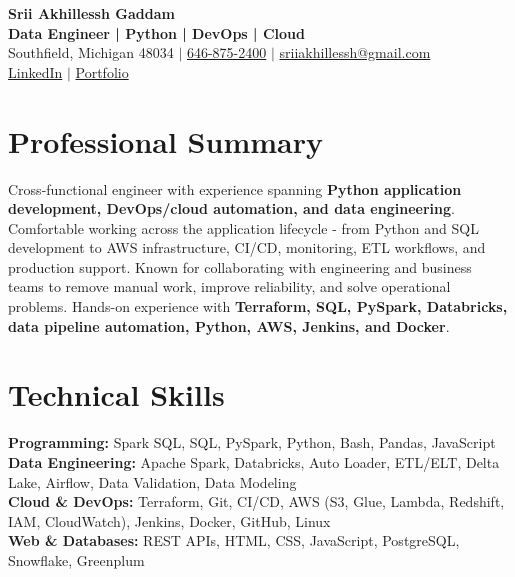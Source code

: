 \documentclass[letterpaper,10pt]{article}
\begin{document}
\fontsize{9.35pt}{10.45pt}\selectfont

\begin{center}
    {\LARGE \textbf{Srii Akhillessh Gaddam}} \\[-1pt]
    \textbf{Data Engineer | Python | DevOps | Cloud} \\[2pt]
    Southfield, Michigan 48034 $|$
    \href{tel:6468752400}{646-875-2400} $|$
    \href{mailto:sriiakhillessh@gmail.com}{sriiakhillessh@gmail.com} \\[1pt]
    \href{https://www.linkedin.com/in/srii-akhiilessh-gaddam-b48668191/}{LinkedIn} $|$
    \href{https://sriiakhillesshg.github.io/portfolio/}{Portfolio}
\end{center}
\vspace{-8pt}

\section{Professional Summary}
\small{Cross-functional engineer with experience spanning \textbf{Python application development, DevOps/cloud automation, and data engineering}. Comfortable working across the application lifecycle - from Python and SQL development to AWS infrastructure, CI/CD, monitoring, ETL workflows, and production support. Known for collaborating with engineering and business teams to remove manual work, improve reliability, and solve operational problems. Hands-on experience with \textbf{Terraform, SQL, PySpark, Databricks, data pipeline automation, Python, AWS, Jenkins, and Docker}.}

\section{Technical Skills}
\small{
\textbf{Programming:} Spark SQL, SQL, PySpark, Python, Bash, Pandas, JavaScript \\
\textbf{Data Engineering:} Apache Spark, Databricks, Auto Loader, ETL/ELT, Delta Lake, Airflow, Data Validation, Data Modeling \\
\textbf{Cloud \& DevOps:} Terraform, Git, CI/CD, AWS (S3, Glue, Lambda, Redshift, IAM, CloudWatch), Jenkins, Docker, GitHub, Linux \\
\textbf{Web \& Databases:} REST APIs, HTML, CSS, JavaScript, PostgreSQL, Snowflake, Greenplum
}

\end{document}
